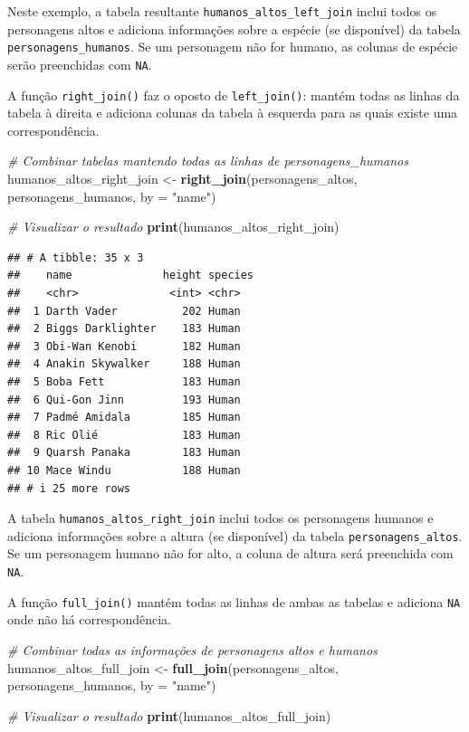 \documentclass[
]{book}
\newenvironment{Shaded}{\begin{snugshade}}{\end{snugshade}}
\newcommand{\AttributeTok}[1]{\textcolor[rgb]{0.13,0.29,0.53}{#1}}
\newcommand{\CommentTok}[1]{\textcolor[rgb]{0.56,0.35,0.01}{\textit{#1}}}
\newcommand{\FunctionTok}[1]{\textcolor[rgb]{0.13,0.29,0.53}{\textbf{#1}}}
\newcommand{\NormalTok}[1]{#1}
\newcommand{\OtherTok}[1]{\textcolor[rgb]{0.56,0.35,0.01}{#1}}
\newcommand{\StringTok}[1]{\textcolor[rgb]{0.31,0.60,0.02}{#1}}
\begin{document}
Neste exemplo, a tabela resultante \texttt{humanos\_altos\_left\_join} inclui
todos os personagens altos e adiciona informações sobre a espécie (se
disponível) da tabela \texttt{personagens\_humanos}. Se um personagem não for
humano, as colunas de espécie serão preenchidas com \texttt{NA}.

A função \texttt{right\_join()} faz o oposto de \texttt{left\_join()}: mantém todas as
linhas da tabela à direita e adiciona colunas da tabela à esquerda para
as quais existe uma correspondência.

\begin{Shaded}
\begin{Highlighting}[]
\CommentTok{\# Combinar tabelas mantendo todas as linhas de personagens\_humanos}
\NormalTok{humanos\_altos\_right\_join }\OtherTok{\textless{}{-}} \FunctionTok{right\_join}\NormalTok{(personagens\_altos, personagens\_humanos, }\AttributeTok{by =} \StringTok{"name"}\NormalTok{)}

\CommentTok{\# Visualizar o resultado}
\FunctionTok{print}\NormalTok{(humanos\_altos\_right\_join)}
\end{Highlighting}
\end{Shaded}

\begin{verbatim}
## # A tibble: 35 x 3
##    name              height species
##    <chr>              <int> <chr>  
##  1 Darth Vader          202 Human  
##  2 Biggs Darklighter    183 Human  
##  3 Obi-Wan Kenobi       182 Human  
##  4 Anakin Skywalker     188 Human  
##  5 Boba Fett            183 Human  
##  6 Qui-Gon Jinn         193 Human  
##  7 Padmé Amidala        185 Human  
##  8 Ric Olié             183 Human  
##  9 Quarsh Panaka        183 Human  
## 10 Mace Windu           188 Human  
## # i 25 more rows
\end{verbatim}

A tabela \texttt{humanos\_altos\_right\_join} inclui todos os personagens humanos
e adiciona informações sobre a altura (se disponível) da tabela
\texttt{personagens\_altos}. Se um personagem humano não for alto, a coluna de
altura será preenchida com \texttt{NA}.

A função \texttt{full\_join()} mantém todas as linhas de ambas as tabelas e
adiciona \texttt{NA} onde não há correspondência.

\begin{Shaded}
\begin{Highlighting}[]
\CommentTok{\# Combinar todas as informações de personagens altos e humanos}
\NormalTok{humanos\_altos\_full\_join }\OtherTok{\textless{}{-}} \FunctionTok{full\_join}\NormalTok{(personagens\_altos, personagens\_humanos, }\AttributeTok{by =} \StringTok{"name"}\NormalTok{)}

\CommentTok{\# Visualizar o resultado}
\FunctionTok{print}\NormalTok{(humanos\_altos\_full\_join)}
\end{Highlighting}
\end{Shaded}
\end{document}
